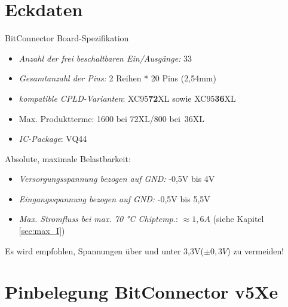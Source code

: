 \documentclass{article}
\begin{document}
\section{Eckdaten} 

BitConnector Board-Spezifikation
\begin{itemize}
	\item \textit{Anzahl der frei beschaltbaren Ein/Ausgänge:} \hspace{0.3cm} 33
	\item \textit{Gesamtanzahl der Pins:} \hspace{3.6cm} 2 Reihen * 20 Pins (2,54mm)
	\item \textit{kompatible CPLD-Varianten}: \hspace{2.8cm} XC95\textbf{72}XL sowie XC95\textbf{36}XL
	\item Max. Produktterme: \hspace{4.1cm} 1600 bei 72XL/800 bei~36XL
	\item \textit{IC-Package}: \hspace{5.3cm} VQ44 
\end{itemize}

Absolute, maximale Belastbarkeit:
\begin{itemize}
	\item \textit{Versorgungsspannung bezogen auf GND:} \hspace{1cm} -0,5V bis 4V
	\item \textit{Eingangsspannung bezogen auf GND:} \hspace{1.45cm} -0,5V bis 5,5V
	\item \textit{Max. Stromfluss bei max. 70 \si{\celsius} Chiptemp.}:\hspace{0.6cm} $\approx1,6A$ (siehe Kapitel \ref{sec:max_I})
\end{itemize}

Es wird empfohlen, Spannungen über und unter 3,3V($\pm 0,3V$) zu vermeiden!

\section{Pinbelegung BitConnector v5Xe}
\label{sec:Pins}
\end{document}
